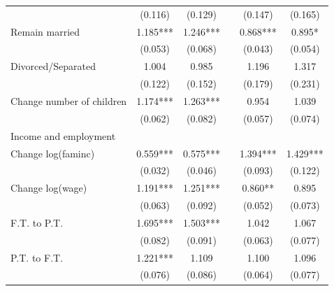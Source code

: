 \begin{center}
\begin{threeparttable}
\begin{tabular}{lccccc}
                                       &     (0.116)   &     (0.129)   &&     (0.147)   &     (0.165)   \\
\hspace{.1in}Remain married            &       1.185***&       1.246***&&       0.868***&       0.895*  \\
                                       &     (0.053)   &     (0.068)   &&     (0.043)   &     (0.054)   \\
\hspace{.1in}Divorced/Separated        &       1.004   &       0.985   &&       1.196   &       1.317   \\
                                       &     (0.122)   &     (0.152)   &&     (0.179)   &     (0.231)   \\
\hspace{.1in}Change number of children &       1.174***&       1.263***&&       0.954   &       1.039   \\
                                       &     (0.062)   &     (0.082)   &&     (0.057)   &     (0.074)   \\
Income and employment                  &               &               &&&\\[1ex]
\hspace{.1in}Change log(faminc)        &       0.559***&       0.575***&&       1.394***&       1.429***\\
                                       &     (0.032)   &     (0.046)   &&     (0.093)   &     (0.122)   \\
\hspace{.1in}Change log(wage)          &       1.191***&       1.251***&&       0.860** &       0.895   \\
                                       &     (0.063)   &     (0.092)   &&     (0.052)   &     (0.073)   \\
\hspace{.1in}F.T. to P.T.              &       1.695***&       1.503***&&       1.042   &       1.067   \\
                                       &     (0.082)   &     (0.091)   &&     (0.063)   &     (0.077)   \\
\hspace{.1in}P.T. to F.T.              &       1.221***&       1.109   &&       1.100   &       1.096   \\
                                       &     (0.076)   &     (0.086)   &&     (0.064)   &     (0.077)   \\

\end{tabular}
\end{threeparttable}
\end{center}
